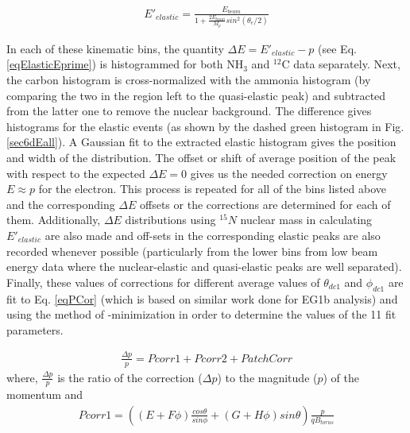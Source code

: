 \begin{eqnarray}
\label{eqElasticEprime}
E'_{elastic} = \frac{E_{beam}}{1+\frac{2E_{beam}}{M_p}sin^2(\theta_e/2)}
\end{eqnarray}


In each of these kinematic bins, the quantity $\Delta E = E'_{elastic} - p$ (see Eq. \ref{eqElasticEprime}) is histogrammed for both NH$_3$ and $^{12}$C data separately. Next, the carbon histogram is cross-normalized with the ammonia histogram (by comparing the two in the region left to the quasi-elastic peak) and subtracted from the latter one to remove the nuclear background. The difference gives  histograms for the elastic events (as shown by the dashed green histogram in Fig. \ref{sec6dEall}). A Gaussian fit to the extracted elastic histogram gives the position and width of the distribution. The offset or shift of average position of the peak with respect to the expected $\Delta E = 0$ gives us the needed correction on energy $E \approx p$ for the electron. This process is repeated for all of the bins listed above and the corresponding $\Delta E$ offsets or the corrections are determined for each of them. Additionally, $\Delta E$ distributions using $^{15}N$ nuclear mass in calculating $E'_{elastic}$ are also made and off-sets in the corresponding elastic peaks are also recorded whenever possible (particularly from the lower \th bins from low beam energy data where the nuclear-elastic and quasi-elastic peaks are well separated).
Finally, these values of corrections for different average values of $\theta_{dc1}$ and $\phi_{dc1}$ are fit to Eq. \ref{eqPCor} (which is based on similar work done for EG1b analysis\cite{nGuler_th})
and using the method of \chisq-minimization in order to determine the values of the 11 fit parameters.


\begin{eqnarray}
\label{eqPCor}
\frac{\Delta p}{p} = Pcorr1 + Pcorr2 + PatchCorr
\end{eqnarray}
where, $\frac{\Delta p}{p}$ is the ratio of the correction ($\Delta p$) to the magnitude ($p$) of the momentum and 
\begin{eqnarray}
\label{eqPCor1}
Pcorr1 = \left( (E+F\phi)\frac{cos\theta}{sin\phi} + (G+H\phi)sin\theta   \right) \frac{p}{qB_{torus}} %
\end{eqnarray}


